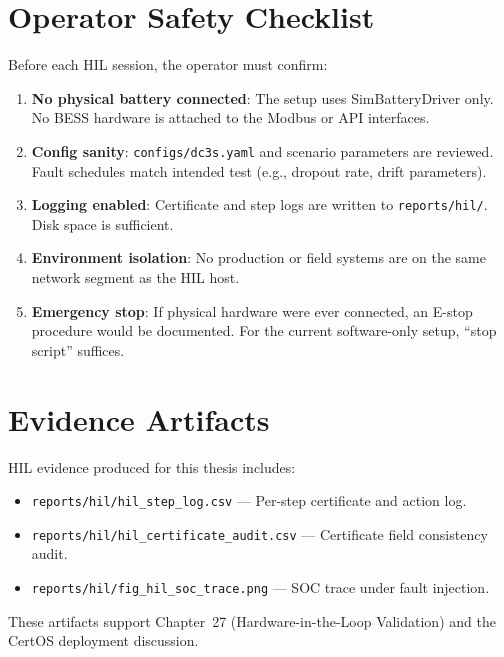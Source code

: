 \section{Operator Safety Checklist}

Before each HIL session, the operator must confirm:

\begin{enumerate}
\item \textbf{No physical battery connected}: The setup uses SimBatteryDriver only. No BESS hardware is attached to the Modbus or API interfaces.
\item \textbf{Config sanity}: \texttt{configs/dc3s.yaml} and scenario parameters are reviewed. Fault schedules match intended test (e.g., dropout rate, drift parameters).
\item \textbf{Logging enabled}: Certificate and step logs are written to \texttt{reports/hil/}. Disk space is sufficient.
\item \textbf{Environment isolation}: No production or field systems are on the same network segment as the HIL host.
\item \textbf{Emergency stop}: If physical hardware were ever connected, an E-stop procedure would be documented. For the current software-only setup, ``stop script'' suffices.
\end{enumerate}

\section{Evidence Artifacts}

HIL evidence produced for this thesis includes:
\begin{itemize}
\item \texttt{reports/hil/hil\_step\_log.csv} --- Per-step certificate and action log.
\item \texttt{reports/hil/hil\_certificate\_audit.csv} --- Certificate field consistency audit.
\item \texttt{reports/hil/fig\_hil\_soc\_trace.png} --- SOC trace under fault injection.
\end{itemize}

These artifacts support Chapter~27 (Hardware-in-the-Loop Validation) and the CertOS deployment discussion.
